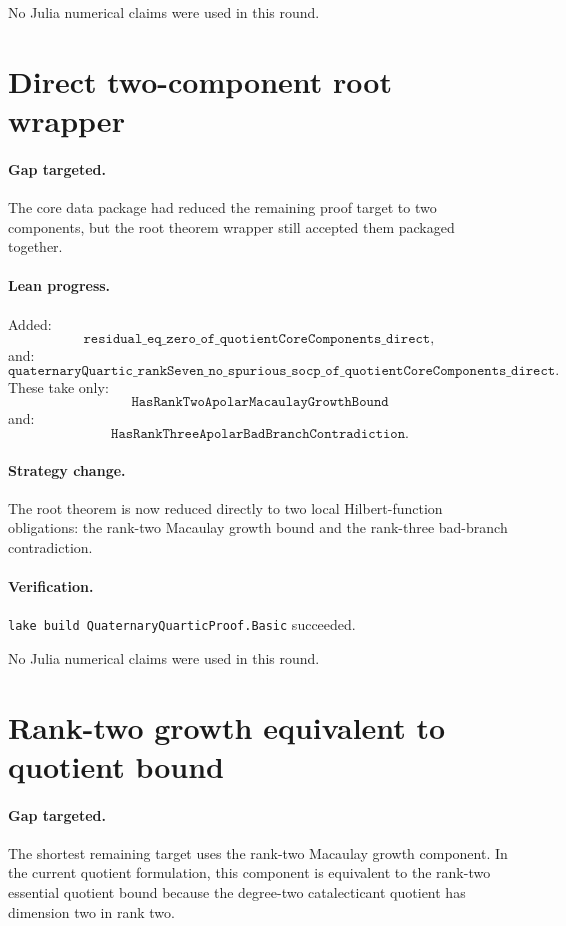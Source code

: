 \documentclass[11pt]{article}
\begin{document}
No Julia numerical claims were used in this round.

\section*{Direct two-component root wrapper}

\paragraph{Gap targeted.}
The core data package had reduced the remaining proof target to two
components, but the root theorem wrapper still accepted them packaged together.

\paragraph{Lean progress.}
Added:
\[
\texttt{residual\_eq\_zero\_of\_quotientCoreComponents\_direct},
\]
and:
\[
\texttt{quaternaryQuartic\_rankSeven\_no\_spurious\_socp\_of\_quotientCoreComponents\_direct}.
\]
These take only:
\[
\texttt{HasRankTwoApolarMacaulayGrowthBound}
\]
and:
\[
\texttt{HasRankThreeApolarBadBranchContradiction}.
\]

\paragraph{Strategy change.}
The root theorem is now reduced directly to two local Hilbert-function
obligations: the rank-two Macaulay growth bound and the rank-three bad-branch
contradiction.

\paragraph{Verification.}
\texttt{lake build QuaternaryQuarticProof.Basic} succeeded.

No Julia numerical claims were used in this round.

\section*{Rank-two growth equivalent to quotient bound}

\paragraph{Gap targeted.}
The shortest remaining target uses the rank-two Macaulay growth component.
In the current quotient formulation, this component is equivalent to the
rank-two essential quotient bound because the degree-two catalecticant quotient
has dimension two in rank two.
\end{document}
